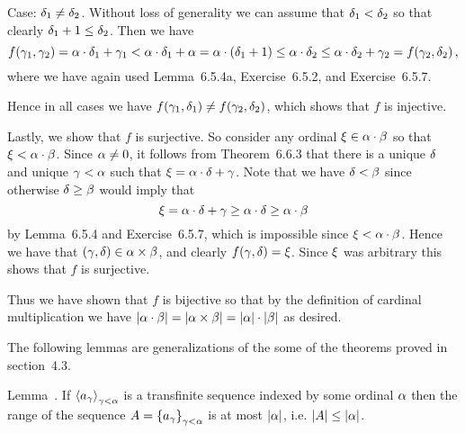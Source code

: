 \begin{solution}
{        Case: $\delta_1 \neq \delta_2$.
        Without loss of generality we can assume that $\delta_1 < \delta_2$ so that clearly $\delta_1 + 1 \leq \delta_2$.
        Then we have
        $$
        f(\gamma_1, \gamma_2) = \alpha \cdot \delta_1 + \gamma_1 < \alpha \cdot \delta_1 + \alpha = \alpha \cdot (\delta_1 + 1) \leq \alpha \cdot \delta_2 \leq \alpha \cdot \delta_2 + \gamma_2 = f(\gamma_2, \delta_2) \,,
        $$
        where we have again used Lemma~6.5.4a, Exercise~6.5.2, and Exercise~6.5.7.

        Hence in all cases we have $f(\gamma_1, \delta_1) \neq f(\gamma_2, \delta_2)$, which shows that $f$ is injective.

        Lastly, we show that $f$ is surjective.
        So consider any ordinal $\xi \in \alpha \cdot \beta$ so that $\xi < \alpha \cdot \beta$.
        Since $\alpha \neq 0$, it follows from Theorem~6.6.3 that there is a unique $\delta$ and unique $\gamma < \alpha$ such that $\xi = \alpha \cdot \delta + \gamma$.
        Note that we have $\delta < \beta$ since otherwise $\delta \geq \beta$ would imply that
        $$
        \xi = \alpha \cdot \delta + \gamma \geq \alpha \cdot \delta \geq \alpha \cdot \beta
        $$
        by Lemma~6.5.4 and Exercise~6.5.7, which is impossible since $\xi < \alpha \cdot \beta$.
        Hence we have that $(\gamma, \delta) \in \alpha \times \beta$, and clearly $f(\gamma, \delta) = \xi$.
        Since $\xi$ was arbitrary this shows that $f$ is surjective.

        Thus we have shown that $f$ is bijective so that by the definition of cardinal multiplication we have $\left| \alpha \cdot \beta \right| = \left| \alpha \times \beta \right| = \left| \alpha \right| \cdot \left| \beta \right|$ as desired. \qedsymbol
     }

     The following lemmas are generalizations of the some of the theorems proved in section~4.3.

     \iffalse
    \begin{statement}{Lemma~\ex.}
        If $\left\langle a_\gamma \right\rangle_{\gamma < \alpha}$ is a transfinite sequence indexed by some ordinal $\alpha$ then the range of the sequence $A = \left\{ a_\gamma \right\}_{\gamma < \alpha}$ is at most $\left| \alpha \right|$, i.e. $\left| A \right| \leq \left| \alpha \right|$.
    \end{statement}
\end{solution}
